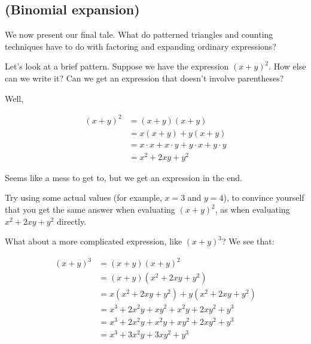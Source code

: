 % 


\subsection{(Binomial expansion)}

We now present our final tale. What do patterned triangles and counting techniques have to do with factoring and expanding ordinary expressions? %

Let's look at a brief pattern. Suppose we have the expression $(x+y)^2$. How else can we write it? Can we get an expression that doesn't involve parentheses?

Well,

\begin{align*}
(x+y)^2 &= (x+y)(x+y) \\
&= x(x+y) + y(x+y) \\
&= x \cdot x + x \cdot y + y \cdot x + y \cdot y \\
&= x^2 + 2xy + y^2
\end{align*}


Seems like a mess to get to, but we get an expression in the end.

\begin{exercise}
Try using some actual values (for example, $x=3$ and $y=4$), to convince yourself that you get the same answer when evaluating $(x+y)^2$, as when evaluating $x^2 + 2xy + y^2$ directly. 
\end{exercise}

What about a more complicated expression, like $(x+y)^3$? We see that:

\begin{align*}
(x+y)^3 &= (x+y)(x+y)^2 \\
&= (x+y)(x^2+2xy+y^2) \\
&= x(x^2+2xy+y^2) + y(x^2+2xy+y^2) \\
&= x^3 + 2x^2y + xy^2 + x^2y + 2xy^2 + y^3 \\
&= x^3 + 2x^2y + x^2y + xy^2 + 2xy^2 + y^3 \\
&= x^3 + 3x^2y + 3xy^2 + y^3 \\
\end{align*}

